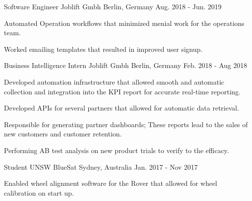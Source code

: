 \begin{cventries}
  \cventry
    {Software Engineer} %
    {Joblift Gmbh} %
    {Berlin, Germany} %
    {Aug. 2018 - Jun. 2019} %
    {
      \begin{cvitems} %
        \item {Automated Operation workflows that minimized menial work for the operations team.}
        \item {Worked emailing templates that resulted in improved user signup.}
      \end{cvitems}
    }

  \cventry
    {Business Intelligence Intern} %
    {Joblift Gmbh} %
    {Berlin, Germany} %
    {Feb. 2018 - Aug 2018} %
    {
      \begin{cvitems} %
        \item {Developed automation infrastructure that allowed smooth and automatic collection and integration into the KPI report for accurate real-time reporting.}
        \item {Developed APIs for several partners that allowed for automatic data retrieval.}
        \item {Responsible for generating partner dashboards; These reports lead to the sales of new customers and customer retention.}
        \item {Performing AB test analysis on new product trials to verify to the efficacy.}
      \end{cvitems}
    }

  \cventry
    {Student} %
    {UNSW BlueSat} %
    {Sydney, Australia} %
    {Jan. 2017 - Nov 2017} %
    {
      \begin{cvitems} %
        \item {Enabled wheel alignment software for the Rover that allowed for wheel calibration on start up.}
      \end{cvitems}
    }


\end{cventries}
